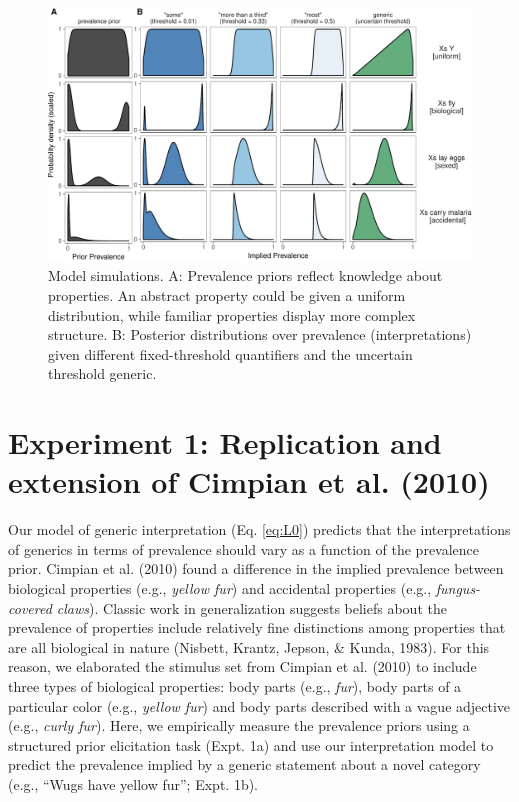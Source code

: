 \documentclass[floatsintext,man]{apa6}
\theoremstyle{definition}
\theoremstyle{definition}
\theoremstyle{definition}
\theoremstyle{remark}
\begin{document}
\begin{figure}
\centering
\includegraphics{genint_files/figure-latex/modelSimulations-1.pdf}
\caption{\label{fig:modelSimulations}Model simulations. A: Prevalence priors
reflect knowledge about properties. An abstract property could be given
a uniform distribution, while familiar properties display more complex
structure. B: Posterior distributions over prevalence (interpretations)
given different fixed-threshold quantifiers and the uncertain threshold
generic.}
\end{figure}

\section{Experiment 1: Replication and extension of Cimpian et al.
(2010)}\label{experiment-1-replication-and-extension-of-cimpian-et-al.-2010}

Our model of generic interpretation (Eq. \ref{eq:L0}) predicts that the
interpretations of generics in terms of prevalence should vary as a
function of the prevalence prior. Cimpian et al. (2010) found a
difference in the implied prevalence between biological properties
(e.g., \emph{yellow fur}) and accidental properties (e.g.,
\emph{fungus-covered claws}). Classic work in generalization suggests
beliefs about the prevalence of properties include relatively fine
distinctions among properties that are all biological in nature
(Nisbett, Krantz, Jepson, \& Kunda, 1983). For this reason, we
elaborated the stimulus set from Cimpian et al. (2010) to include three
types of biological properties: body parts (e.g., \emph{fur}), body
parts of a particular color (e.g., \emph{yellow fur}) and body parts
described with a vague adjective (e.g., \emph{curly fur}). Here, we
empirically measure the prevalence priors using a structured prior
elicitation task (Expt. 1a) and use our interpretation model to predict
the prevalence implied by a generic statement about a novel category
(e.g., \enquote{Wugs have yellow fur}; Expt. 1b).
\end{document}
